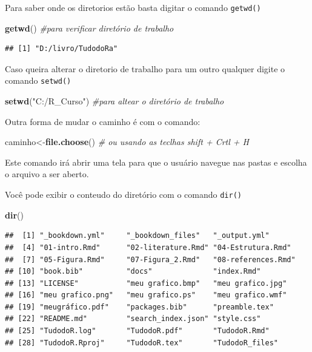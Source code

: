 \documentclass[]{book}
\newenvironment{Shaded}{\begin{snugshade}}{\end{snugshade}}
\newcommand{\CommentTok}[1]{\textcolor[rgb]{0.56,0.35,0.01}{\textit{#1}}}
\newcommand{\KeywordTok}[1]{\textcolor[rgb]{0.13,0.29,0.53}{\textbf{#1}}}
\newcommand{\NormalTok}[1]{#1}
\newcommand{\StringTok}[1]{\textcolor[rgb]{0.31,0.60,0.02}{#1}}
\begin{document}
Para saber onde os diretorios estão basta digitar o comando \texttt{getwd()}

\begin{Shaded}
\begin{Highlighting}[]
 \KeywordTok{getwd}\NormalTok{() }\CommentTok{#para verificar  diretório de trabalho}
\end{Highlighting}
\end{Shaded}

\begin{verbatim}
## [1] "D:/livro/TudodoRa"
\end{verbatim}

Caso queira alterar o diretorio de trabalho para um outro qualquer digite o comando \texttt{setwd()}

\begin{Shaded}
\begin{Highlighting}[]
\KeywordTok{setwd}\NormalTok{(}\StringTok{"C:/R_Curso"}\NormalTok{) }\CommentTok{#para  altear o diretório de trabalho}
\end{Highlighting}
\end{Shaded}

Outra forma de mudar o caminho é com o comando:

\begin{Shaded}
\begin{Highlighting}[]
\NormalTok{caminho<-}\KeywordTok{file.choose}\NormalTok{() }\CommentTok{# ou usando as teclhas shift + Crtl + H}
\end{Highlighting}
\end{Shaded}

Este comando irá abrir uma tela para que o usuário navegue nas pastas e escolha o arquivo a ser aberto.

Você pode exibir o conteudo do diretório com o comando \texttt{dir()}

\begin{Shaded}
\begin{Highlighting}[]
\KeywordTok{dir}\NormalTok{()}
\end{Highlighting}
\end{Shaded}

\begin{verbatim}
##  [1] "_bookdown.yml"     "_bookdown_files"   "_output.yml"      
##  [4] "01-intro.Rmd"      "02-literature.Rmd" "04-Estrutura.Rmd" 
##  [7] "05-Figura.Rmd"     "07-Figura_2.Rmd"   "08-references.Rmd"
## [10] "book.bib"          "docs"              "index.Rmd"        
## [13] "LICENSE"           "meu grafico.bmp"   "meu grafico.jpg"  
## [16] "meu grafico.png"   "meu grafico.ps"    "meu grafico.wmf"  
## [19] "meugráfico.pdf"    "packages.bib"      "preamble.tex"     
## [22] "README.md"         "search_index.json" "style.css"        
## [25] "TudodoR.log"       "TudodoR.pdf"       "TudodoR.Rmd"      
## [28] "TudodoR.Rproj"     "TudodoR.tex"       "TudodoR_files"
\end{verbatim}
\end{document}
